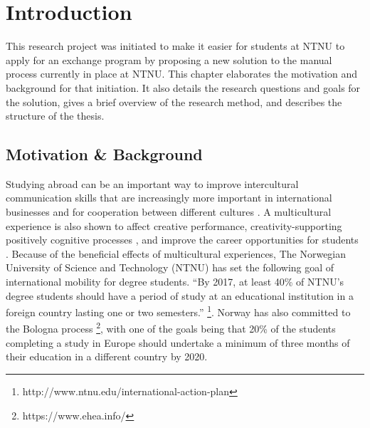 
\chapter{Introduction}\label{chap:1}

This research project was initiated to make it easier for students at NTNU to apply for an exchange program by proposing a new solution to the manual process currently in place at NTNU. This chapter elaborates the motivation and background for that initiation. It also details the research questions and goals for the solution, gives a brief overview of the research method, and describes the structure of the thesis.

\section{Motivation \& Background}
Studying abroad can be an important way to improve intercultural communication skills that are increasingly more important in international businesses and for cooperation between different cultures \cite{williams2005exploring}. A multicultural experience is also shown to affect creative performance, creativity-supporting positively cognitive processes \cite{leung2008multicultural}, and improve the career opportunities for students \cite{brandenburg2014erasmus}. Because of the beneficial effects of multicultural experiences, The Norwegian University of Science and Technology (NTNU) has set the following goal of international mobility for degree students. \enquote{By 2017, at least 40\% of NTNU's degree students should have a period of study at an educational institution in a foreign country lasting one or two semesters.} \footnote{http://www.ntnu.edu/international-action-plan}. Norway has also committed to the Bologna process \footnote{https://www.ehea.info/}, with one of the goals being that 20\% of the students completing a study in Europe should undertake a minimum of three months of their education in a different country by 2020.

